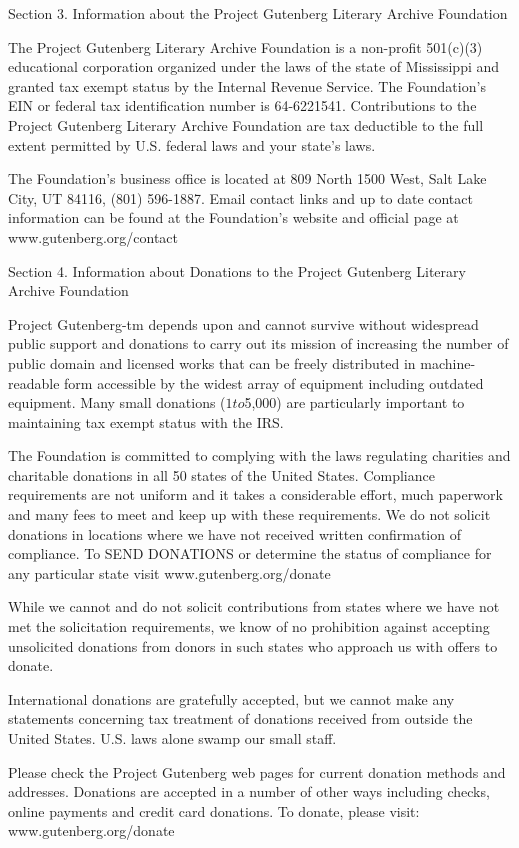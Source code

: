 Section 3. Information about the Project Gutenberg Literary
Archive Foundation

The Project Gutenberg Literary Archive Foundation is a non-profit
501(c)(3) educational corporation organized under the laws of the
state of Mississippi and granted tax exempt status by the Internal
Revenue Service. The Foundation's EIN or federal tax identification
number is 64-6221541. Contributions to the Project Gutenberg Literary
Archive Foundation are tax deductible to the full extent permitted by
U.S. federal laws and your state's laws.

The Foundation's business office is located at 809 North 1500 West,
Salt Lake City, UT 84116, (801) 596-1887. Email contact links and up
to date contact information can be found at the Foundation's website
and official page at www.gutenberg.org/contact

Section 4. Information about Donations to the Project Gutenberg
Literary Archive Foundation

Project Gutenberg-tm depends upon and cannot survive without
widespread public support and donations to carry out its mission of
increasing the number of public domain and licensed works that can be
freely distributed in machine-readable form accessible by the widest
array of equipment including outdated equipment. Many small donations
($1 to $5,000) are particularly important to maintaining tax exempt
status with the IRS.

The Foundation is committed to complying with the laws regulating
charities and charitable donations in all 50 states of the United
States. Compliance requirements are not uniform and it takes a
considerable effort, much paperwork and many fees to meet and keep up
with these requirements. We do not solicit donations in locations
where we have not received written confirmation of compliance. To SEND
DONATIONS or determine the status of compliance for any particular
state visit www.gutenberg.org/donate

While we cannot and do not solicit contributions from states where we
have not met the solicitation requirements, we know of no prohibition
against accepting unsolicited donations from donors in such states who
approach us with offers to donate.

International donations are gratefully accepted, but we cannot make
any statements concerning tax treatment of donations received from
outside the United States. U.S. laws alone swamp our small staff.

Please check the Project Gutenberg web pages for current donation
methods and addresses. Donations are accepted in a number of other
ways including checks, online payments and credit card donations. To
donate, please visit: www.gutenberg.org/donate

